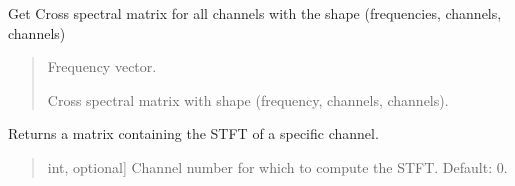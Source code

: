 \documentclass[letterpaper,10pt,english]{sphinxmanual}
\begin{document}
\begin{fulllineitems}

\begin{fulllineitems}
\label{\detokenize{classes:dsptoolbox.classes.signal_class.Signal.get_csm}}
\pysigstartsignatures
{}
\pysigstopsignatures
\sphinxAtStartPar
Get Cross spectral matrix for all channels with the shape
(frequencies, channels, channels)
\begin{quote}\begin{description}
\begin{description}
\sphinxlineitem{\sphinxstylestrong{f\_csm}}{[}\sphinxtitleref{np.ndarray}{]}
\sphinxAtStartPar
Frequency vector.

\sphinxlineitem{\sphinxstylestrong{csm}}{[}\sphinxtitleref{np.ndarray}{]}
\sphinxAtStartPar
Cross spectral matrix with shape (frequency, channels, channels).

\end{description}

\end{description}\end{quote}

\end{fulllineitems}


\begin{fulllineitems}
\label{\detokenize{classes:dsptoolbox.classes.signal_class.Signal.get_spectrogram}}
\pysigstartsignatures
{}
\pysigstopsignatures
\sphinxAtStartPar
Returns a matrix containing the STFT of a specific channel.
\begin{quote}\begin{description}
\begin{description}
\sphinxlineitem{\sphinxstylestrong{channel\_number}}{[}int, optional{]}
\sphinxAtStartPar
Channel number for which to compute the STFT. Default: 0.


\end{description}
\end{description}
\end{quote}
\end{fulllineitems}
\end{fulllineitems}
\end{document}
